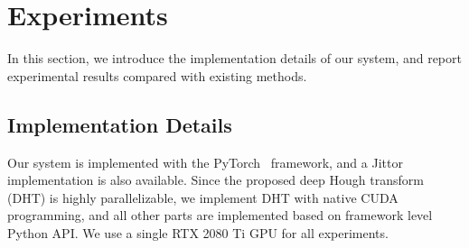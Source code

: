 \documentclass[10pt,journal,cspaper,compsoc]{IEEEtran}
\newcommand{\revise}[1]{{\textcolor{black}{#1}}}
\newcommand{\CheckRmv}[1]{}
\newcommand{\CheckRmv}[1]{#1}
\newcommand{\todo}[1]{{\textcolor{red}{#1}}}%
\begin{document}



\CheckRmv{
\begin{figure*}[tb]
  \centering
  \hfill
  \subfigure[]{
    \begin{overpic}[width=.48\linewidth]{figures/SEL.pdf}
      \put(6, 55){SEL~\cite{lee2017semantic}}
    \end{overpic}
  }\hfill
  \subfigure[]{
    \begin{overpic}[width=0.465\linewidth]{figures/NKL.pdf}
      \put(5, 57){NKL}
    \end{overpic}
  }\hfill
  \vspace{-10pt}
  \caption{
    \revise{
    Category distribution of SEL (a) and NKL (b) datasets.
    Category labels are obtained through a Places365 pretrained model.
    There are 327 (totally 365) scene labels presented in NKL dataset,
    in contrast to 167 in SEL dataset.
    The labels of NKL are also more fairly distributed compared to
    that of SEL.}
  }
  \label{fig:dataset_distribution}
\end{figure*}
}

\section{Experiments}\label{sec:experiments}
In this section, we introduce the implementation details of our system,
and report experimental results compared with existing methods.


\subsection{Implementation Details} \label{sec:protocol}
% 
Our system is implemented with the PyTorch~\cite{paszke2019pytorch} framework,
and a Jittor~\cite{hu2020jittor} implementation is also available.
%
Since the proposed deep Hough transform (DHT) is highly parallelizable,
we implement DHT with native CUDA programming,
and all other parts are implemented based on framework level Python API.
We use a single RTX 2080 Ti GPU for all experiments.
\end{document}
